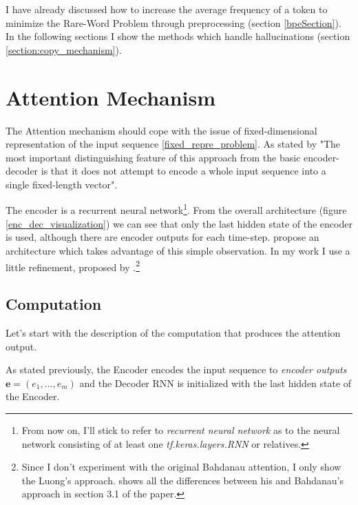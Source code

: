 I have already discussed how to increase the average frequency of a token to minimize the Rare-Word Problem through preprocessing (section \ref{bpeSection}). In the following sections I show the methods which handle hallucinations (section \ref{section:copy_mechanism}).

\section{Attention Mechanism}

The Attention mechanism should cope with the issue of fixed-dimensional representation of the input sequence \ref{fixed_repre_problem}. As stated by \citep{bahdanau2016neural} "The most important distinguishing feature of this approach from the basic encoder-decoder is that it does not attempt to encode a whole input sequence into a single fixed-length vector".

The encoder is a recurrent neural network\footnote{From now on, I'll stick to refer to \emph{recurrent neural network} as to the neural network consisting of at least one \emph{tf.keras.layers.RNN} or relatives.}. From the overall architecture (figure \ref{enc_dec_visualization}) we can see that only the last hidden state of the encoder is used, although there are encoder outputs for each time-step. \citep{bahdanau2016neural} propose an architecture which takes advantage of this simple observation. In my work I use a little refinement, proposed by \citep{luong2015effective}.\footnote{Since I don't experiment with the original Bahdanau attention, I only show the Luong's approach. \citep{luong2015effective} shows all the differences between his and Bahdanau's approach in section 3.1 of the paper.}

\subsection{Computation}

Let's start with the description of the computation that produces the attention output.

As stated previously, the Encoder encodes the input sequence to \emph{encoder outputs} $\boldsymbol{e} = (e_1, \dots, e_m)$ and the Decoder RNN is initialized with the last hidden state of the Encoder.

